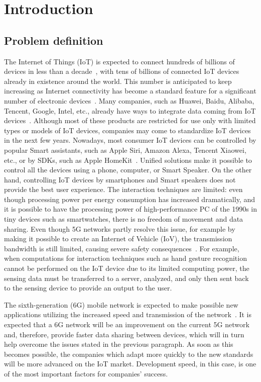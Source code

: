 
\chapter{Introduction}

\section{Problem definition}

The Internet of Things (IoT) is expected to connect hundreds of billions of devices in less than a decade~\cite{simiscuka_synchronisation_2018}, with tens of billions of connected IoT devices already in existence around the world. This number is anticipated to keep increasing as Internet connectivity has become a standard feature for a significant number of electronic devices~\cite{hu_virtual_2021}. Many companies, such as Huawei, Baidu, Alibaba, Tencent, Google, Intel, etc., already have ways to integrate data coming from IoT devices~\cite{perera}. Although most of these products are restricted for use only with limited types or models of IoT devices, companies may come to standardize IoT devices in the next few years. Nowadays, most consumer IoT devices can be controlled by popular Smart assistants, such as Apple Siri, Amazon Alexa, Tencent Xiaowei, etc., or by SDKs, such as Apple HomeKit~\cite{perera}. Unified solutions make it possible to control all the devices using a phone, computer, or Smart Speaker.
On the other hand, controlling IoT devices by smartphones and Smart speakers does not provide the best user experience. The interaction techniques are limited: even though processing power per energy consumption has increased dramatically, and it is possible to have the processing power of high-performance PC of the 1990s in tiny devices such as smartwatches, there is no freedom of movement and data sharing. Even though 5G networks partly resolve this issue, for example by making it possible to create an Internet of Vehicle (IoV), the transmission bandwidth is still limited, causing severe safety consequences~\cite{hu_virtual_2021}. For example, when computations for interaction techniques such as hand gesture recognition cannot be performed on the IoT device due to its limited computing power, the sensing data must be transferred to a server, analyzed, and only then sent back to the sensing device to provide an output to the user.

The sixth-generation (6G) mobile network is expected to make possible new applications utilizing the increased speed and transmission of the network~\cite{huang_survey_2019, liao_information-centric_2021}. It is expected that a 6G network will be an improvement on the current 5G network and, therefore, provide faster data sharing between devices, which will in turn help overcome the issues stated in the previous paragraph. As soon as this becomes possible, the companies which adapt more quickly to the new standards will be more advanced on the IoT market. Development speed, in this case, is one of the most important factors for companies' success.

